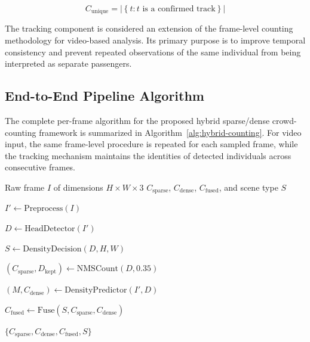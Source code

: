 \documentclass[12pt,a4paper]{report}
\begin{document}
\begin{equation}
C_{\mathrm{unique}}
=
\left|
\left\{
t:
t\text{ is a confirmed track}
\right\}
\right|
\label{eq:unique-count}
\end{equation}

The tracking component is considered an extension of the frame-level
counting methodology for video-based analysis. Its primary purpose is to
improve temporal consistency and prevent repeated observations of the same
individual from being interpreted as separate passengers.


\subsection{End-to-End Pipeline Algorithm}

The complete per-frame algorithm for the proposed hybrid sparse/dense
crowd-counting framework is summarized in Algorithm~\ref{alg:hybrid-counting}.
For video input, the same frame-level procedure is repeated for each sampled
frame, while the tracking mechanism maintains the identities of detected
individuals across consecutive frames.

\begin{algorithm}[htbp]
\caption{Hybrid Sparse/Dense Crowd Counting for a Single Frame}
\label{alg:hybrid-counting}

\begin{algorithmic}[1]

\Require Raw frame $I$ of dimensions $H \times W \times 3$
\Ensure $C_{\mathrm{sparse}}$, $C_{\mathrm{dense}}$,
$C_{\mathrm{fused}}$, and scene type $S$

\State $I' \gets \mathrm{Preprocess}(I)$

\State $D \gets \mathrm{HeadDetector}(I')$

\State $S \gets \mathrm{DensityDecision}(D,H,W)$

\State $(C_{\mathrm{sparse}},D_{\mathrm{kept}})
    \gets \mathrm{NMSCount}(D,0.35)$

\State $(M,C_{\mathrm{dense}})
    \gets \mathrm{DensityPredictor}(I',D)$

\State $C_{\mathrm{fused}}
    \gets \mathrm{Fuse}(S,C_{\mathrm{sparse}},C_{\mathrm{dense}})$

\State \Return
$\{C_{\mathrm{sparse}},C_{\mathrm{dense}},
C_{\mathrm{fused}},S\}$

\end{algorithmic}
\end{algorithm}
\end{document}
